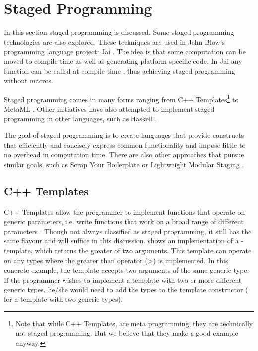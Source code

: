 \section{Staged Programming}
In this section staged programming is discussed. Some staged programming technologies are also explored. These techniques are used in John Blow's programming language project: Jai \cite{youtubeJonathanBlow}. The idea is that some computation can be moved to compile time as well as generating platform-specific code. In Jai any function can be called at compile-time \cite{github:jaiPrimer}, thus achieving staged programming without macros.

Staged programming comes in many forms ranging from C++ Templates\footnote{Note that while C++ Templates, are meta programming, they are technically not staged programming. But we believe that they make a good example anyway.} \cite{c++:templates} to MetaML \cite{sheard1998using}. Other initiatives have also attempted to implement staged programming in other languages, such as Haskell \cite{sheard2002template}.

The goal of staged programming is to create languages that provide constructs that efficiently and concisely express common functionality and impose little to no overhead in computation time. There are also other approaches that pursue similar goals, such as Scrap Your Boilerplate \cite{lammel2003scrap} or Lightweight Modular Staging \cite{rompf2010lightweight}.

\subsection{C++ Templates}
C++ Templates allow the programmer to implement functions that operate on generic parameters, i.e. write functions that work on a broad range of different parameters \cite{c++:templates:tutorial}. Though not always classified as staged programming, it still has the same flavour and will suffice in this discussion.
 shows an implementation of a -template, which returns the greater of two arguments. This template can operate on any types where the greater than operator (\textgreater) is implemented. In this concrete example, the template accepts two arguments of the same generic type. If the programmer wishes to implement a template with two or more different generic types, he/she would need to add the types to the template constructor ( for a template with two generic types).

